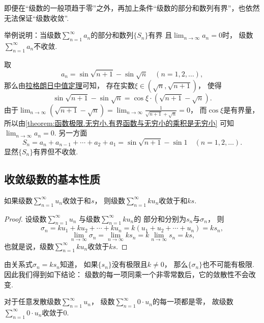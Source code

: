 即便在“级数的一般项趋于零”之外，再加上条件“级数的部分和数列有界”，也依然无法保证“级数收敛”.
\begin{example}
举例说明：当级数\(\sum_{n=1}^\infty a_n\)的部分和数列\(\{S_n\}\)有界
且\(\lim_{n\to\infty} a_n = 0\)时，
级数\(\sum_{n=1}^\infty a_n\)不收敛.
\begin{solution}
取\[
	a_n = \sin\sqrt{n+1} - \sin\sqrt{n}
	\quad(n=1,2,\dotsc),
\]
那么由\hyperref[theorem:微分中值定理.拉格朗日中值定理]{拉格朗日中值定理}可知，
存在实数\(\xi\in(\sqrt{n},\sqrt{n+1})\)，
使得\[
	\sin\sqrt{n+1} - \sin\sqrt{n}
	= \cos\xi \cdot (\sqrt{n+1} - \sqrt{n}).
\]
由于\(\lim_{n\to\infty} (\sqrt{n+1} - \sqrt{n})
= \lim_{n\to\infty} \frac1{\sqrt{n+1} + \sqrt{n}}
= 0\)，
而\(\cos\xi\)是有界量，
所以由\cref{theorem:函数极限.无穷小.有界函数与无穷小的乘积是无穷小}
可知\(\lim_{n\to\infty} a_n = 0\).
另一方面\[
	S_n = a_n + a_{n-1} + \dotsb + a_2 + a_1
	= \sin\sqrt{n+1} - \sin1
	\quad(n=1,2,\dotsc).
\]
显然\(\{S_n\}\)有界但不收敛.
\end{solution}
\end{example}

\subsection{收敛级数的基本性质}
\begin{property}\label{theorem:无穷级数.收敛级数性质1}
如果级数\(\sum_{n=1}^\infty u_n\)收敛于和\(s\)，
则级数\(\sum_{n=1}^\infty k u_n\)收敛于和\(ks\).
\begin{proof}
设级数\(\sum_{n=1}^\infty u_n\)
与级数\(\sum_{n=1}^\infty k u_n\)的
部分和分别为\(s_n\)与\(\sigma_n\)，
则\[
	\sigma_n
	= k u_1 + k u_2 + \dotsb + k u_n
	= k(u_1 + u_2 + \dotsb + u_n) = k s_n,
\]\[
	\lim_{n\to\infty} \sigma_n
	= \lim_{n\to\infty} k s_n
	= k \lim_{n\to\infty} s_n = ks,
\]
也就是说，级数\(\sum_{n=1}^\infty k u_n\)收敛于\(ks\).
\end{proof}
\end{property}
\begin{remark}
由关系式\(\sigma_n = k s_n\)知道，
如果\(\{s_n\}\)没有极限且\(k\neq0\)，
那么\(\{\sigma_n\}\)也不可能有极限.
因此我们得到如下结论：
{\color{red}级数的每一项同乘一个非零常数后，它的敛散性不会改变.}
\end{remark}
\begin{remark}
对于任意发散级数\(\sum_{n=1}^\infty u_n\)，
级数\(\sum_{n=1}^\infty 0 \cdot u_n\)的每一项都是零，
故级数\(\sum_{n=1}^\infty 0 \cdot u_n\)收敛于\(0\).
\end{remark}


